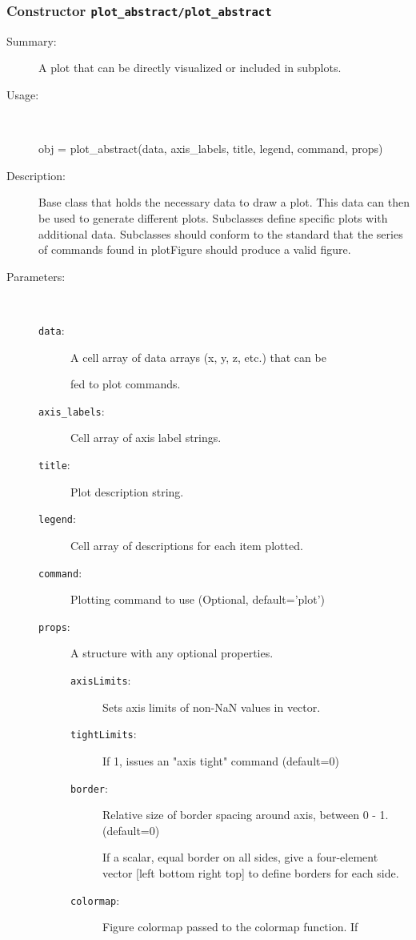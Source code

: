 \subsubsection[Constructor \texttt{plot\_abstract}]{Constructor \texttt{plot\_abstract/plot\_abstract}}%
%
\label{ref_plot_abstract__plot_abstract}%
\hypertarget{ref_plot_abstract__plot_abstract}{}%
\begin{description}
\item[Summary:]A plot that can be directly visualized or included in subplots.
%
\item[Usage:]~%
\begin{lyxcode}%
obj = plot\_abstract(data, axis\_labels, title, legend, command, props)
%
\end{lyxcode}%
%
\item[Description:]%
Base class that holds the necessary data to draw a plot. This data
 can then be used to generate different plots. Subclasses define specific
 plots with additional data. Subclasses should conform to the standard 
 that the series of commands found in plotFigure should produce a valid
 figure.
\item[Parameters:]~
\begin{description}%
\item[\texttt{data}:]
 A cell array of data arrays (x, y, z, etc.) that can be 

fed to plot commands.
\item[\texttt{axis\_labels}:]
 Cell array of axis label strings.
\item[\texttt{title}:]
 Plot description string.
\item[\texttt{legend}:]
 Cell array of descriptions for each item plotted.
\item[\texttt{command}:]
 Plotting command to use (Optional, default='plot')
\item[\texttt{props}:]
 A structure with any optional properties.
\begin{description}%
\item[\texttt{axisLimits}:]
 Sets axis limits of non-NaN values in vector.
\item[\texttt{tightLimits}:]
 If 1, issues an "axis tight" command (default=0)
\item[\texttt{border}:]
 Relative size of border spacing around axis, between 0 - 1. (default=0)

If a scalar, equal border on all sides, give a four-element vector 
[left bottom right top] to define borders for each side.
\item[\texttt{colormap}:]
 Figure colormap passed to the colormap function. If 


\end{description}
\end{description}
\end{description}

